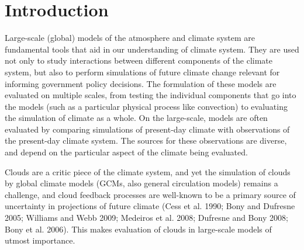 \chapter{Introduction}\label{sec:introductionux5fchapter}

Large-scale (global) models of the atmosphere and climate system are
fundamental tools that aid in our understanding of climate system. They
are used not only to study interactions between different components of
the climate system, but also to perform simulations of future climate
change relevant for informing government policy decisions. The
formulation of these models are evaluated on multiple scales, from
testing the individual components that go into the models (such as a
particular physical process like convection) to evaluating the
simulation of climate as a whole. On the large-scale, models are often
evaluated by comparing simulations of present-day climate with
observations of the present-day climate system. The sources for these
observations are diverse, and depend on the particular aspect of the
climate being evaluated.

Clouds are a critic piece of the climate system, and yet the simulation
of clouds by global climate models (GCMs, also general circulation
models) remains a challenge, and cloud feedback processes are well-known
to be a primary source of uncertainty in projections of future climate
(Cess et al. 1990; Bony and Dufresne 2005; Williams and Webb 2009;
Medeiros et al. 2008; Dufresne and Bony 2008; Bony et al. 2006). This
makes evaluation of clouds in large-scale models of utmost importance.

